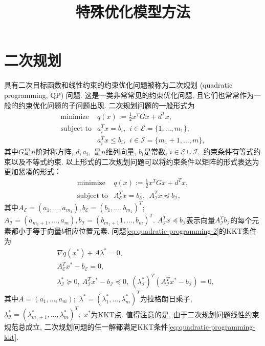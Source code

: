 \documentclass{SBCbookchapter}
\author{}
\title{特殊优化模型方法}
\numberwithin{equation}{section}
\begin{document}
\maketitle


\section{二次规划}
\label{sec:7.2}

具有二次目标函数和线性约束的约束优化问题被称为二次规划 (quadratic programming, QP) 问题. 这是一类非常常见的约束优化问题, 且它们也常常作为一般的约束优化问题的子问题出现. 二次规划问题的一般形式为
\begin{equation}
\label{eq:quadratic-programming-1}
\begin{array}{cl}
\text{minimize} & q(x) := \frac{1}{2} x^T G x + d^T x, \\
\text{subject to} & a_i^T x = b_i, ~~ i \in \mathcal{E} = \{1, \ldots, m_1\}, \\
& a_i^T x \leqslant b_i, ~~ i \in \mathcal{I} = \{m_1 + 1, \ldots, m\},
\end{array}
\end{equation}
其中$G$是$n$阶对称方阵, $d, a_i,$ 是$n$维列向量, $b_i$是常数, $i \in \mathcal{E} \cup \mathcal{I},$ 约束条件有等式约束以及不等式约束. 以上形式的二次规划问题可以将约束条件以矩阵的形式表达为更加紧凑的形式：
\begin{equation}
\label{eq:quadratic-programming-2}
\begin{array}{cl}
\text{minimize} & q(x) := \frac{1}{2} x^T G x + d^T x, \\
\text{subject to} & A^T_{\mathcal{E}} x = b_{\mathcal{E}}, ~~ A^T_{\mathcal{I}} x \preccurlyeq b_{\mathcal{I}},
\end{array}
\end{equation}
其中$A_{\mathcal{E}} = (a_1, \ldots, a_{m_1}), b_{\mathcal{E}} = (b_1, \ldots, b_{m_1})^T;$ $A_{\mathcal{I}} = (a_{m_1+1}, \ldots, a_m), b_{\mathcal{I}} = (b_{m_1+1}1, \ldots, b_m)^T.$ $A^T_{\mathcal{I}} x \preccurlyeq b_{\mathcal{I}}$表示向量$A^T_{\mathcal{I}} b_{\mathcal{I}}$的每个元素都小于等于向量$b$相应位置元素. 问题\eqref{eq:quadratic-programming-2}的KKT条件为
\begin{equation}
\label{eq:quadratic-programming-kkt}
\begin{aligned}
& \nabla q(x^*) + A \lambda^* = 0, \\
& A^T_{\mathcal{E}} x^* - b_{\mathcal{E}} = 0, \\
& \lambda^*_{\mathcal{I}} \succcurlyeq 0, ~ A_{\mathcal{I}}^T x^* - b_{\mathcal{I}} \preccurlyeq 0, ~ (\lambda^*_{\mathcal{I}})^T (A_{\mathcal{I}}^T x^* - b_{\mathcal{I}}) = 0,
\end{aligned}
\end{equation}
其中$A = (a_1, \ldots, a_m);$ $\lambda^* = (\lambda_1^*, \ldots, \lambda_m^*)^T$为拉格朗日乘子, $\lambda^*_{\mathcal{I}} = (\lambda_{m_1+1}^*, \ldots, \lambda_m^*)^T;$ $x^*$为KKT点. 值得注意的是, 由于二次规划问题线性约束规范总成立, 二次规划问题的任一解都满足KKT条件\eqref{eq:quadratic-programming-kkt}.
\end{document}
